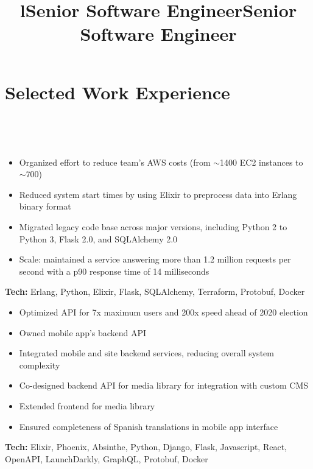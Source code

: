     \section{Selected Work Experience}

        \begin{format}
            \\
            \title{l}\\
            \body
        \end{format}
        
        \title{Senior Software Engineer}
        \begin{position}
	        \vspace{-12pt}\begin{itemize}
				\item Organized effort to reduce team's AWS costs (from $\sim$1400 EC2 instances to $\sim$700)
	        	\item Reduced system start times by using Elixir to preprocess data into Erlang binary format
				\item Migrated legacy code base across major versions, including Python 2 to Python 3, Flask 2.0, and SQLAlchemy 2.0
				\item Scale: maintained a service answering more than 1.2 million requests per second with a p90 response time of 14 milliseconds
			\end{itemize}
			\textbf{Tech:} Erlang, Python, Elixir, Flask, SQLAlchemy, Terraform, Protobuf, Docker
        \end{position}
        
        \title{Senior Software Engineer}
        \begin{position}
            \vspace{-12pt}\begin{itemize}
				\item Optimized API for 7x maximum users and 200x speed ahead of 2020 election
				\item Owned mobile app's backend API
				\item Integrated mobile and site backend services, reducing overall system complexity
				\item Co-designed backend API for media library for integration with custom CMS
				\item Extended frontend for media library
				\item Ensured completeness of Spanish translations in mobile app interface
			\end{itemize}
			\textbf{Tech:} Elixir, Phoenix, Absinthe, Python, Django, Flask, Javascript, React, OpenAPI, LaunchDarkly, GraphQL, Protobuf, Docker
        \end{position}
        
